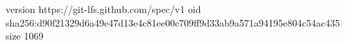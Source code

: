 version https://git-lfs.github.com/spec/v1
oid sha256:d90f21329d6a49e47d13e4c81ee00c709ff9d33ab9a571a94195e804c54ac435
size 1069
